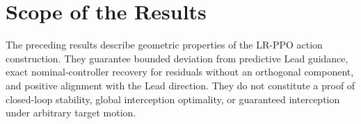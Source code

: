 \documentclass[10pt]{article}
\begin{document}
\section*{Scope of the Results}

The preceding results describe geometric properties of the LR-PPO action
construction. They guarantee bounded deviation from predictive Lead guidance,
exact nominal-controller recovery for residuals without an orthogonal
component, and positive alignment with the Lead direction. They do not
constitute a proof of closed-loop stability, global interception optimality,
or guaranteed interception under arbitrary target motion.
\end{document}
